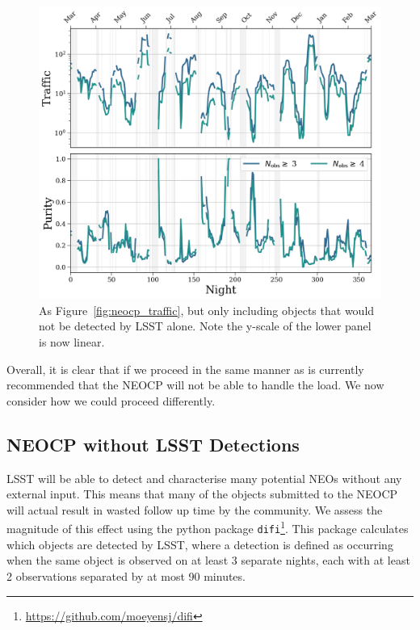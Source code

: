 \documentclass[twocolumn, twocolappendix]{aastex631}
\begin{document}
\begin{figure}
    \centering
    \includegraphics[width=\textwidth]{traffic_purity_unfindable.png}
    \caption{As Figure~\ref{fig:neocp_traffic}, but only including objects that would not be detected by LSST alone. Note the y-scale of the lower panel is now linear.}
    \label{fig:neocp_traffic_unfindable}
\end{figure}

Overall, it is clear that if we proceed in the same manner as is currently recommended that the NEOCP will not be able to handle the load. We now consider how we could proceed differently.

\pagebreak

\subsection{NEOCP without LSST Detections}\label{sec:no_LSST_detections}

LSST will be able to detect and characterise many potential NEOs without any external input. This means that many of the objects submitted to the NEOCP will actual result in wasted follow up time by the community. We assess the magnitude of this effect using the python package \texttt{difi}\footnote{\url{https://github.com/moeyensj/difi}}. This package calculates which objects are detected by LSST, where a detection is defined as occurring when the same object is observed on at least 3 separate nights, each with at least 2 observations separated by at most 90 minutes.
\end{document}
